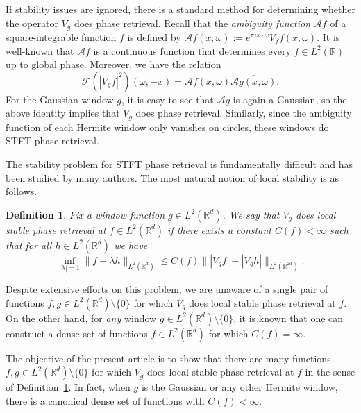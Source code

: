 \documentclass[11pt]{amsart}
\newtheorem{definition}[theorem]{Definition}
\theoremstyle{remark}
\begin{document}
If stability issues are ignored, there is a standard method for determining whether the operator $V_g$ does phase retrieval. Recall that the \emph{ambiguity function} $\mathcal{A}f$  of a square-integrable function $f$ is defined by $\mathcal{A}f(x,\omega):=e^{\pi ix\cdot \omega} V_ff(x,\omega)$. It is well-known that $\mathcal{A}f$ is a continuous function that determines every $f\in L^2(\mathbb{R})$ up to global phase. Moreover, we have the relation 
\begin{equation}\label{Ambiguity to STFT}
    \mathcal{F}\left( |V_g f|^2\right)(\omega,-x)=\mathcal{A}f(x,\omega) \overline{\mathcal{A}g(x,\omega)}.
\end{equation}
For the Gaussian window $g$, it is easy to see that $\mathcal{A}g$ is again a Gaussian, so the above identity implies that $V_g$ does phase retrieval. Similarly, since the ambiguity function of each Hermite window only vanishes on circles, these windows do STFT phase retrieval.
\medskip

The stability problem for STFT phase retrieval is fundamentally difficult and has been studied by many authors. The most natural notion of local stability is as follows.
\begin{definition}\label{defn of local stability}
    Fix a window function $g\in L^2(\mathbb{R}^d)$. We say that $V_g$ does \emph{local stable phase retrieval at $f\in L^2(\mathbb{R}^d)$} if there exists a constant $C(f)<\infty$ such that for all $h\in L^2(\mathbb{R}^d)$ we have
    \begin{equation}\label{SPR local V_g}
        \inf_{|\lambda|=1}\|f-\lambda h\|_{L^2(\mathbb{R}^d)}\leq C(f) \| |V_g f|-|V_g h|\|_{L^2(\mathbb{R}^{2d})}.
    \end{equation}
\end{definition}
Despite extensive efforts on this problem, we are unaware of a single pair of functions $f,g\in L^2(\mathbb{R}^d)\setminus\{0\}$ for which $V_g$ does local stable phase retrieval at $f$. On the other hand, for \emph{any} window $g\in L^2(\mathbb{R}^d)\setminus\{0\}$, it is known \cite{alaifari2025cheeger,Alharbi2024Locality} that one can construct a dense set of functions $f\in L^2(\mathbb{R}^d)$ for which $C(f)=\infty$. 
\medskip

The objective of the present article is to show that there are many functions $f,g\in L^2(\mathbb{R}^d)\setminus\{0\}$ for which $V_g$ does local stable phase retrieval at $f$ in the sense of Definition~\ref{defn of local stability}. In fact, when $g$ is the Gaussian or any other Hermite window, there is a  canonical dense set of functions with $C(f)<\infty.$
\end{document}
